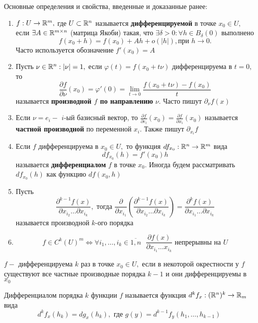 
	Основные определения и свойства, введенные и доказанные ранее:
\begin{enumerate}
			\item $f : U \to \mathbb{R}^m,$ где $U \subset \mathbb{R}^n$ называется \textbf{дифференцируемой} в точке $x_0 \in U,$ если $\exists A \in \mathbb{R}^{m\times n}$ (матрица Якоби) такая, что $\exists \delta > 0 : \forall h \in B_{\delta}(0)$ выполнено
	\[ f(x_0 + h) = f(x_0) + Ah + o(|h|), \text{при } h \to 0. \]
	Часто используется обозначение $f'(x_0) = A$
			\item Пусть $\nu \in \mathbb{R}^n : |\nu|  = 1,$ если $\varphi(t) = f(x_0 + t\nu)$ дифференцируема в $t = 0,$ то 
			\[ \frac{\partial f}{\partial \nu} (x_0) = \varphi'(0) = \lim_{t \to 0} \frac{f(x_0  + t\nu) - f(x_0)}{t} \]
			называется \textbf{производной $f$ по направлению} $\nu$. Часто пишут $\partial_{\nu} f(x)$
			\item Если $\nu = e_i -$ $i$-ый базисный вектор, то $\frac{\partial f}{\partial e_i}(x_0) = \frac{\partial f}{\partial x_i}(x_0)$ называется \textbf{частной производной} по переменной $x_i.$  Также пишут $\partial_{x_i}f$
			\item Если $f$ дифференцируема в $x_0 \in U,$ то функция $df_{x_0} : \mathbb{R}^n \to \mathbb{R}^m$ вида 
			\[ df_{x_0}(h) = f'(x_0)h \]
			называется \textbf{дифференциалом} $f$ в точке $x_0$. Иногда будем рассматривать $df_{x_0}(h)$ как функцию $df(x_0, h)$
			\item Пусть 
				\[ \frac{\partial^{k-1} f(x)}{\partial x_{i_2} \ldots \partial x_{i_{k}}}, \text{ тогда } \frac{\partial}{\partial x_{i_1}}\left( \frac{\partial^{k-1} f(x)}{\partial x_{i_2} \ldots \partial x_{i_{k}}}\right) = \frac{\partial^{k} f(x)}{\partial x_{i_1} \ldots \partial x_{i_{k}}} \]
				называется производной $k$-ого порядка
			\item \[ f \in C^k(U)^m \Leftrightarrow \forall i_1, \ldots, i_k \in \overline{1,n} \text{ } \frac{\partial f(x)}{\partial x_{i_1} \ldots x_{i_k}} \text{ непрерывны на } U \]
\end{enumerate}

\begin{definition}
	$f -$ дифференцируема $k$ раз в точке $x_0 \in U,$ если в некоторой окрестности у $f$ существуют все частные производные порядка $k - 1$ и они дифференцируемы в $x_0$
\end{definition}

\begin{definition}
	Дифференциалом порядка $k$ функции $f$ называется функция $d^kf_x : (\mathbb{R}^n)^k \to \mathbb{R}_m$ вида
	\[ d^kf_x(h_k) = dg_x(h_k), \text{ где } g(y) = d^{k - 1}f_y(h_1, \ldots, h_{k - 1}) \]
\end{definition}

